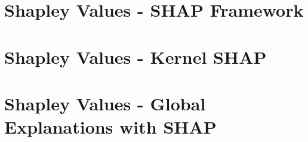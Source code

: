 \documentclass[11pt,compress,t,n
otes=noshow, aspectratio=169, xcolor=table]{beamer}
\begin{document}



% 
% 
% 

\section{Shapley Values - SHAP Framework}


\section{Shapley Values - Kernel SHAP}


\section{Shapley Values - Global Explanations with SHAP}

\end{document}
